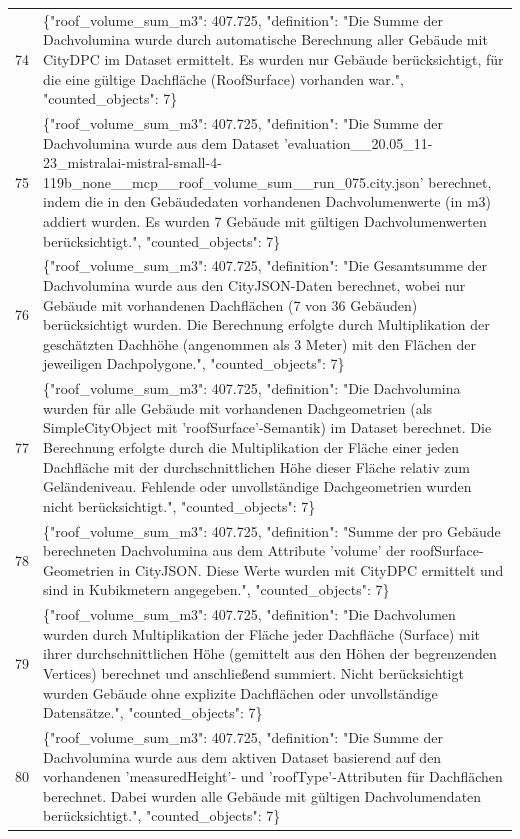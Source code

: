 \documentclass[a4paper,11pt]{article}
\begin{document}
\begin{table}[ht]
\begin{tabular}{r p{12cm}}
74 & \{"roof\_volume\_sum\_m3": 407.725, "definition": "Die Summe der Dachvolumina wurde durch automatische Berechnung aller Gebäude mit CityDPC im Dataset ermittelt. Es wurden nur Gebäude berücksichtigt, für die eine gültige Dachfläche (RoofSurface) vorhanden war.", "counted\_objects": 7\} \\
75 & \{"roof\_volume\_sum\_m3": 407.725, "definition": "Die Summe der Dachvolumina wurde aus dem Dataset 'evaluation\_\_20.05\_11-23\_mistralai-mistral-small-4-119b\_none\_\_mcp\_\_roof\_volume\_sum\_\_run\_075.city.json' berechnet, indem die in den Gebäudedaten vorhandenen Dachvolumenwerte (in m3) addiert wurden. Es wurden 7 Gebäude mit gültigen Dachvolumenwerten berücksichtigt.", "counted\_objects": 7\} \\
76 & \{"roof\_volume\_sum\_m3": 407.725, "definition": "Die Gesamtsumme der Dachvolumina wurde aus den CityJSON-Daten berechnet, wobei nur Gebäude mit vorhandenen Dachflächen (7 von 36 Gebäuden) berücksichtigt wurden. Die Berechnung erfolgte durch Multiplikation der geschätzten Dachhöhe (angenommen als 3 Meter) mit den Flächen der jeweiligen Dachpolygone.", "counted\_objects": 7\} \\
77 & \{"roof\_volume\_sum\_m3": 407.725, "definition": "Die Dachvolumina wurden für alle Gebäude mit vorhandenen Dachgeometrien (als SimpleCityObject mit 'roofSurface'-Semantik) im Dataset berechnet. Die Berechnung erfolgte durch die Multiplikation der Fläche einer jeden Dachfläche mit der durchschnittlichen Höhe dieser Fläche relativ zum Geländeniveau. Fehlende oder unvollständige Dachgeometrien wurden nicht berücksichtigt.", "counted\_objects": 7\} \\
78 & \{"roof\_volume\_sum\_m3": 407.725, "definition": "Summe der pro Gebäude berechneten Dachvolumina aus dem Attribute 'volume' der roofSurface-Geometrien in CityJSON. Diese Werte wurden mit CityDPC ermittelt und sind in Kubikmetern angegeben.", "counted\_objects": 7\} \\
79 & \{"roof\_volume\_sum\_m3": 407.725, "definition": "Die Dachvolumen wurden durch Multiplikation der Fläche jeder Dachfläche (Surface) mit ihrer durchschnittlichen Höhe (gemittelt aus den Höhen der begrenzenden Vertices) berechnet und anschließend summiert. Nicht berücksichtigt wurden Gebäude ohne explizite Dachflächen oder unvollständige Datensätze.", "counted\_objects": 7\} \\
80 & \{"roof\_volume\_sum\_m3": 407.725, "definition": "Die Summe der Dachvolumina wurde aus dem aktiven Dataset basierend auf den vorhandenen 'measuredHeight'- und 'roofType'-Attributen für Dachflächen berechnet. Dabei wurden alle Gebäude mit gültigen Dachvolumendaten berücksichtigt.", "counted\_objects": 7\} \\

\end{tabular}
\end{table}
\end{document}
